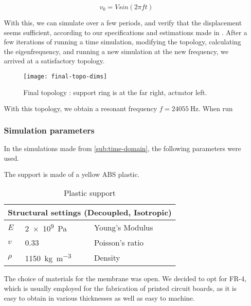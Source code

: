 \begin{equation}
  v_0 = V sin(2\pi f t)
  \label{eq:v0}
\end{equation}

With this, we can simulate over a few periods, and verify that the displacement
seems sufficient, according to our specifications and estimations made in
. After a few iterations of running a time simulation,
modifying the topology, calculating the eigenfrequency, and running a new
simulation at the new frequency, we arrived at a satisfactory topology.

\begin{figure}[!h]
  \begin{center}
    \texttt{[image: final-topo-dims]}
  \end{center}
  \caption{Final topology : support ring is at the far right, actuator left.}
  \label{fig:final-overview}
\end{figure}

With this topology, we obtain a resonant frequency $f = \SI{24055}{\hertz}$.
When run 


\pagebreak
\subsubsection{Simulation parameters}
In the simulations made from \ref{sub:time-domain}, the following parameters
were used.

The support is made of a yellow ABS plastic.

\begin{table}[!h]
  \centering
  \begin{tabular}{l|l|l}
    \multicolumn{3}{l}{Structural settings (Decoupled, Isotropic)}	\\
    \hline
    $E$		& \SI{2e9}{\pascal} 	& Young's Modulus 	\\
    $v$		& \SI{0.33}{}		& Poisson's ratio	\\
    $\rho$	& \SI{1150}{\kilo\gram\per\cubic\metre}	& Density	\\
  \end{tabular}
  \caption{Plastic support}
  \label{tab:properties-plastic}
\end{table}

The choice of materials for the membrane was open. We decided to opt for FR-4,
which is usually employed for the fabrication of printed circuit boards, as it
is easy to obtain in various thicknesses as well as easy to machine.

